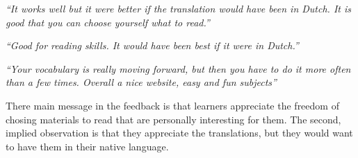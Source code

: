 \begin{description}
  \item {\em ``It works well but it were better if the translation would have been in Dutch. It is good that you can choose yourself what to read.''}
  \item {\em ``Good for reading skills. It would have been best if it were in Dutch.''}
  \item {\em ``Your vocabulary is really moving forward, but then you have to do it more often than a few times. Overall a nice website, easy and fun subjects''}
\end{description}

There main message in the feedback is that learners appreciate the freedom of chosing materials to read that are personally interesting for them. The second, implied observation is that they appreciate the translations, but they would want to have them in their native language. 


